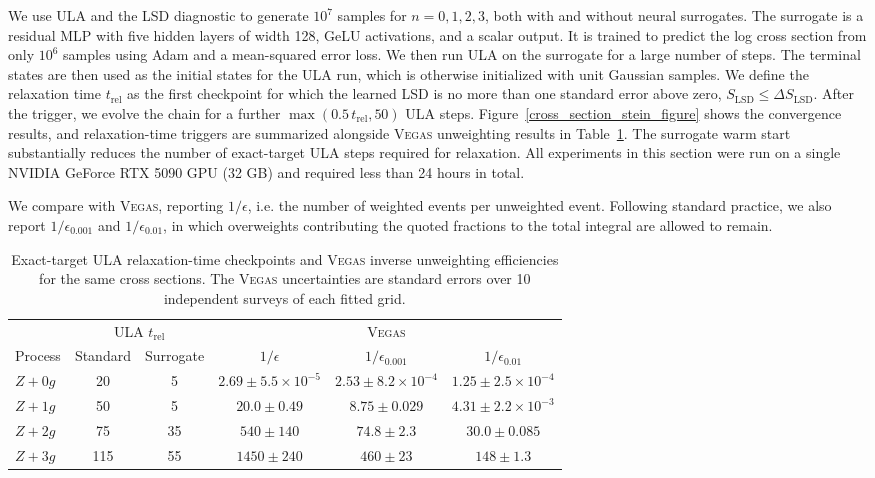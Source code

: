 \documentclass{article}
\newcommand{\vegas}{\textsc{Vegas}}
\begin{document}
We use ULA and the LSD diagnostic to generate $10^7$ samples for $n = 0,1,2,3$, both with and without neural surrogates.
The surrogate is a residual MLP with five hidden layers of width 128, GeLU activations, and a scalar output.
It is trained to predict the log cross section from only $10^6$ samples using Adam and a mean-squared error loss.
We then run ULA on the surrogate for a large number of steps.
The terminal states are then used as the initial states for the ULA run, which is otherwise initialized with unit Gaussian samples.
We define the relaxation time $t_{\mathrm{rel}}$ as the first checkpoint for which the learned LSD is no more than one standard error above zero, $S_{\mathrm{LSD}}\leq \Delta S_{\mathrm{LSD}}$.
After the trigger, we evolve the chain for a further $\max(0.5\,t_{\mathrm{rel}},50)$ ULA steps.
Figure~\ref{cross_section_stein_figure} shows the convergence results, and relaxation-time triggers are summarized alongside \vegas{} unweighting results in Table~\ref{tab:cross_section_relaxation_times}.
The surrogate warm start substantially reduces the number of exact-target ULA steps required for relaxation.
All experiments in this section were run on a single NVIDIA GeForce RTX 5090 GPU (32 GB) and required less than 24 hours in total.

We compare with \vegas{}, reporting $1/\epsilon$, i.e. the number of weighted events per unweighted event.
Following standard practice, we also report $1/\epsilon_{0.001}$ and $1/\epsilon_{0.01}$, in which overweights contributing the quoted fractions to the total integral are allowed to remain.

\begin{table}[htbp]
  \caption{Exact-target ULA relaxation-time checkpoints and \vegas{} inverse unweighting efficiencies for the same cross sections.
  The \vegas{} uncertainties are standard errors over 10 independent surveys of each fitted grid.}
  \label{tab:cross_section_relaxation_times}
  \centering
  \setlength{\tabcolsep}{4pt}
  \begin{tabular}{lccccc}
    \toprule
    & \multicolumn{2}{c}{ULA $t_{\mathrm{rel}}$} & \multicolumn{3}{c}{\vegas{}} \\
    \cmidrule(lr){2-3}\cmidrule(lr){4-6}
    Process & Standard & Surrogate & $1/\epsilon$ & $1/\epsilon_{0.001}$ & $1/\epsilon_{0.01}$ \\
    \midrule
    $Z+0g$ & 20 & 5 & $2.69 \pm 5.5\times10^{-5}$ & $2.53 \pm 8.2\times10^{-4}$ & $1.25 \pm 2.5\times10^{-4}$ \\
    $Z+1g$ & 50 & 5 & $20.0 \pm 0.49$ & $8.75 \pm 0.029$ & $4.31 \pm 2.2\times10^{-3}$ \\
    $Z+2g$ & 75 & 35 & $540 \pm 140$ & $74.8 \pm 2.3$ & $30.0 \pm 0.085$ \\
    $Z+3g$ & 115 & 55 & $1450 \pm 240$ & $460 \pm 23$ & $148 \pm 1.3$ \\
    \bottomrule
  \end{tabular}
\end{table}
\end{document}
